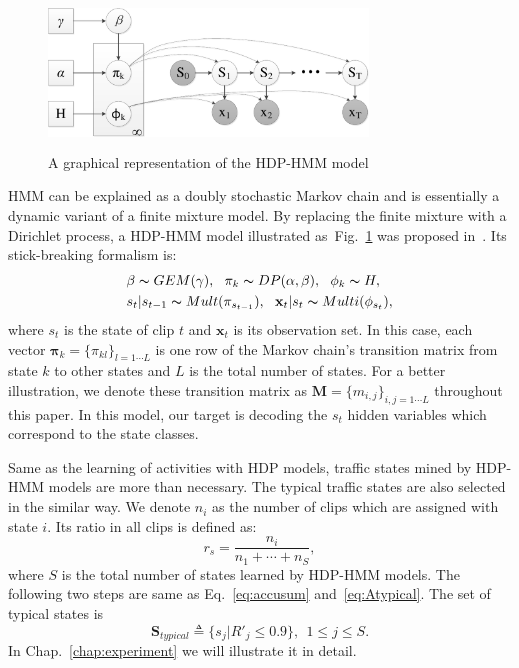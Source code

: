 \begin{figure}[!htbp]
	\center
	\includegraphics[width=8.5cm, height =4cm]{figures/HDP-HMM-crop.pdf}
	\caption{A graphical representation of the HDP-HMM model}
	\label{hdp_hmm}
\end{figure}

HMM can be explained as a doubly stochastic Markov chain and is essentially a dynamic variant of a finite mixture model. By replacing the finite mixture with a Dirichlet process, a HDP-HMM model illustrated as~Fig.~\ref{hdp_hmm} was proposed in~\cite{teh2006hdp}. Its stick-breaking formalism is:
\begin{align*}
	& \beta \thicksim GEM(\gamma), ~~\mathbf{\pi}_k \thicksim DP(\alpha,\beta),~~ \phi_k \thicksim H ,\\
	& s_t|s_{t-1} \thicksim Mult(\mathbf{\pi}_{s_{t-1}}),~~\mathbf{x}_t|s_t \thicksim Multi(\phi_{s_t}),
\end{align*}
where $s_t$ is the state of clip $t$ and $\mathbf{x}_t$ is its observation set. In this case, each vector $\mathbf{\pi}_k=\{\pi_{kl}\}_{l=1\cdots L}$ is one row of the Markov chain's transition matrix from state $k$ to other states and $L$ is the total number of states. For a better illustration, we denote these transition matrix as $\mathbf{M} = \{m_{i,j}\}_{i,j=1\cdots L}$ throughout this paper.
In this model, our target is decoding the $s_t$ hidden variables which correspond to the state classes. 

Same as the learning of activities with HDP models, traffic states mined by HDP-HMM models are more than necessary. The typical traffic states are also selected in the similar way. We denote $n_i$ as the number of clips which are assigned with state $i$. Its ratio in all clips is defined as:
\begin{equation}
	r_s = \frac{n_i}{n_1+\cdots+n_S},
\end{equation} 
where $S$ is the total number of states learned by HDP-HMM models. The following two steps are same as Eq.~\eqref{eq:accusum} and~\eqref{eq:Atypical}. The set of typical states is
\begin{equation}
	\mathbf{S}_{typical} \triangleq \{s_j|R'_j \leq 0.9\},~~1\leq j \leq S.
\end{equation} 
In Chap.~\ref{chap:experiment} we will illustrate it in detail.

